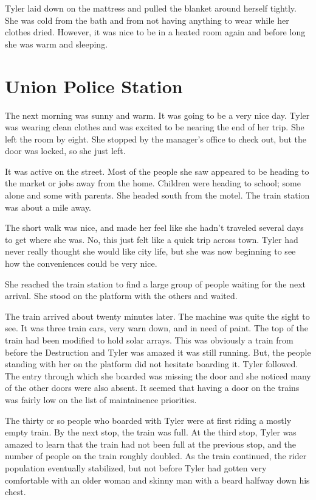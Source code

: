 \documentclass[courier]{sffms}
\begin{document}
Tyler laid down on the mattress and pulled the blanket
around herself tightly. She was cold from the bath and from
not having anything to wear while her clothes dried.
However, it was nice to be in a heated room again and before
long she was warm and sleeping.

\chapter{Union Police Station}
The next morning was sunny and warm. It was going
to be a very nice day. Tyler was wearing clean clothes
and was excited to be nearing the end of her trip.
She left the room by eight. She stopped by the
manager's office to check out, but the door was locked,
so she just left.

It was active on the street. Most of the people she saw
appeared to be heading to the market or jobs away from
the home. Children were heading to school; some alone
and some with parents. She headed south from the motel.
The train station was about a mile away.

The short walk was nice, and made her feel like she
hadn't traveled several days to get where she was. No, this
just felt like a quick trip across town. Tyler had never
really thought she would like city life, but she was now
beginning to see how the conveniences could be very nice.

She reached the train station to find a large group of
people waiting for the next arrival. She stood on the
platform with the others and waited.

The train arrived about twenty minutes later. The machine
was quite the sight to see. It was three train cars, very
warn down, and in need of paint. The top of the train had
been modified to hold solar arrays. This was obviously
a train from before the Destruction and Tyler was amazed it
was still running. But, the people standing with her on the
platform did not hesitate boarding it. Tyler followed.
The entry through which she boarded was missing the door
and she noticed many of the other doors were also absent.
It seemed that having a door on the trains was fairly low
on the list of maintainence priorities.

The thirty or so people who boarded with Tyler were at
first riding a mostly empty train. By the next stop, the train
was full. At the third stop, Tyler was amazed to learn that
the train had not been full at the previous stop, and the
number of people on the train roughly doubled. As the train
continued, the rider population eventually stabilized, but
not before Tyler had gotten very comfortable with an older
woman and skinny man with a beard halfway down his chest.
\end{document}
